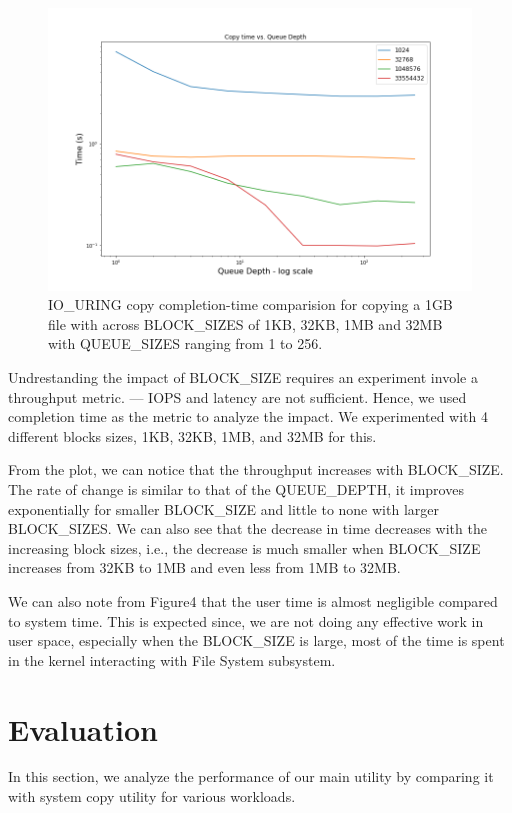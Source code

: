 \documentclass{article}
\begin{document}
\begin{figure}
    \centering
    \includegraphics[scale = 0.3]{cp_qd.png}
    \caption{IO\_URING copy completion-time comparision for copying a 1GB file with across BLOCK\_SIZES 
    of 1KB, 32KB, 1MB and 32MB with QUEUE\_SIZES ranging from 1 to 256.}
    \label{Figure4}
\end{figure}

Undrestanding the impact of BLOCK\_SIZE requires an experiment invole a throughput metric. — IOPS and latency are not sufficient. 
Hence, we used completion time as the metric to analyze the impact. We experimented with 4 different blocks sizes, 1KB, 32KB, 
1MB, and 32MB for this.

From the plot, we can notice that the throughput increases with BLOCK\_SIZE. The rate of change is similar to that of the 
QUEUE\_DEPTH, it improves exponentially for smaller BLOCK\_SIZE and little to none with larger BLOCK\_SIZES. We can also see that 
the decrease in time decreases with the increasing block sizes, i.e., the decrease is much smaller when BLOCK\_SIZE increases 
from 32KB to 1MB and even less from 1MB to 32MB.

We can also note from Figure4 that the user time is almost negligible compared to system time. This is expected since, we are 
not doing any effective work in user space, especially when the BLOCK\_SIZE is large, most of the time is spent in the kernel 
interacting with File System subsystem. 

\section{Evaluation}
In this section, we analyze the performance of our main utility by comparing it with system copy utility for various workloads.
\end{document}
